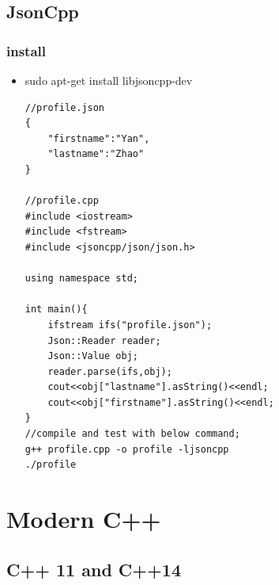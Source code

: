 \documentclass[a4paper,11pt,twoside]{book}
\begin{document}
\section{JsonCpp}
\subsection{install}
\begin{itemize}
    \item sudo apt-get install libjsoncpp-dev
\begin{lstlisting}[]
//profile.json
{
    "firstname":"Yan",
    "lastname":"Zhao"
}

//profile.cpp
#include <iostream>
#include <fstream>
#include <jsoncpp/json/json.h>

using namespace std;

int main(){
    ifstream ifs("profile.json");
    Json::Reader reader;
    Json::Value obj;
    reader.parse(ifs,obj);
    cout<<obj["lastname"].asString()<<endl;
    cout<<obj["firstname"].asString()<<endl;
}
//compile and test with below command;
g++ profile.cpp -o profile -ljsoncpp
./profile
\end{lstlisting}
\end{itemize}

\chapter{Modern C++}
\section{C++ 11 and C++14}
\end{document}
